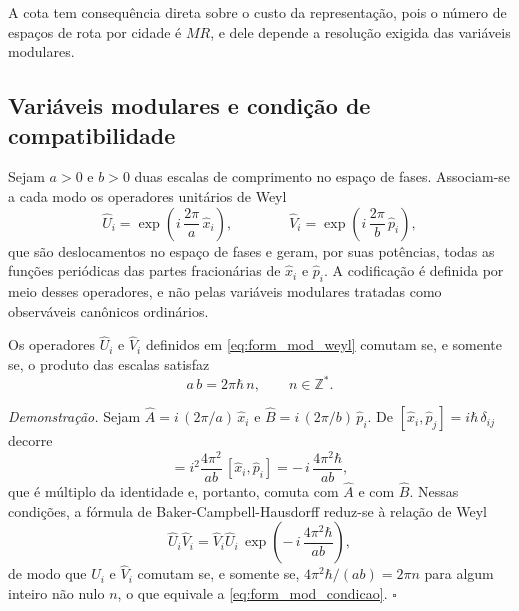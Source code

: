         A cota tem consequência direta sobre o custo da representação, pois o número de espaços de rota por cidade é $MR$, e dele depende a resolução exigida das variáveis modulares.

    \subsection{Variáveis modulares e condição de compatibilidade}\label{subsec:form_mod_variaveis}

        Sejam $a > 0$ e $b > 0$ duas escalas de comprimento no espaço de fases. Associam-se a cada modo os operadores unitários de Weyl
        \begin{equation}\label{eq:form_mod_weyl}
            \hat{U}_i = \exp\!\left( i\,\frac{2\pi}{a}\, \hat{x}_i \right) ,
            \qquad\qquad
            \hat{V}_i = \exp\!\left( i\,\frac{2\pi}{b}\, \hat{p}_i \right) ,
        \end{equation}
        \noindent que são deslocamentos no espaço de fases e geram, por suas potências, todas as funções periódicas das partes fracionárias de $\hat{x}_i$ e $\hat{p}_i$. A codificação é definida por meio desses operadores, e não pelas variáveis modulares tratadas como observáveis canônicos ordinários.

        \begin{prop}\label{prop:form_mod_comutacao}
            Os operadores $\hat{U}_i$ e $\hat{V}_i$ definidos em \autoref{eq:form_mod_weyl} comutam se, e somente se, o produto das escalas satisfaz
            \begin{equation}\label{eq:form_mod_condicao}
                a\,b = 2\pi\hbar\, n , \qquad n \in \mathbb{Z}^{*} .
            \end{equation}
        \end{prop}

        \noindent\textit{Demonstração.} Sejam $\hat{A} = i\,(2\pi/a)\,\hat{x}_i$ e $\hat{B} = i\,(2\pi/b)\,\hat{p}_i$. De $[\hat{x}_i, \hat{p}_j] = i\hbar\,\delta_{ij}$ decorre
        \begin{equation*}
            [\hat{A}, \hat{B}] = i^2 \frac{4\pi^2}{ab}\, [\hat{x}_i, \hat{p}_i]
            = -\,i\,\frac{4\pi^2 \hbar}{ab} ,
        \end{equation*}
        \noindent que é múltiplo da identidade e, portanto, comuta com $\hat{A}$ e com $\hat{B}$. Nessas condições, a fórmula de Baker-Campbell-Hausdorff reduz-se à relação de Weyl
        \begin{equation}\label{eq:form_mod_weyl_rel}
            \hat{U}_i \hat{V}_i = \hat{V}_i \hat{U}_i \,
            \exp\!\left( -\,i\,\frac{4\pi^2\hbar}{ab} \right) ,
        \end{equation}
        \noindent de modo que $\hat{U}_i$ e $\hat{V}_i$ comutam se, e somente se, $4\pi^2\hbar / (ab) = 2\pi n$ para algum inteiro não nulo $n$, o que equivale a \autoref{eq:form_mod_condicao}. \hfill$\square$


